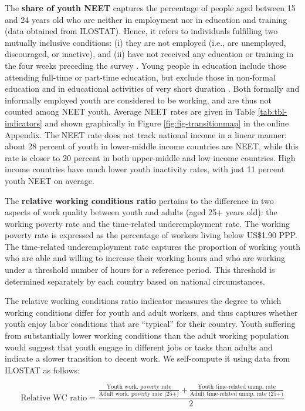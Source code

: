\documentclass[
  a4paper, twoside, 12pt]{book}
\begin{document}
The \textbf{share of youth NEET} captures the percentage of people aged between 15 and 24 years old who are neither in employment nor in education and training (data obtained from ILOSTAT). Hence, it refers to individuals fulfilling two mutually inclusive conditions: (i) they are not employed (i.e., are unemployed, discouraged, or inactive), and (ii) have not received any education or training in the four weeks preceding the survey \autocite{elder2015a}. Young people in education include those attending full-time or part-time education, but exclude those in non-formal education and in educational activities of very short duration \autocite{oecd2019}. Both formally and informally employed youth are considered to be working, and are thus not counted among NEET youth. Average NEET rates are given in Table \ref{tab:tbl-indicators} and shown graphically in Figure \ref{fig:fig-transitionmap} in the online Appendix. The NEET rate does not track national income in a linear manner: about 28 percent of youth in lower-middle income countries are NEET, while this rate is closer to 20 percent in both upper-middle and low income countries. High income countries have much lower youth inactivity rates, with just 11 percent youth NEET on average.

The \textbf{relative working conditions ratio} pertains to the difference in two aspects of work quality between youth and adults (aged 25+ years old): the working poverty rate and the time-related underemployment rate. The working poverty rate is expressed as the percentage of workers living below US\$1.90 PPP. The time-related underemployment rate captures the proportion of working youth who are able and willing to increase their working hours and who are working under a threshold number of hours for a reference period. This threshold is determined separately by each country based on national circumstances.

The relative working conditions ratio indicator measures the degree to which working conditions differ for youth and adult workers, and thus captures whether youth enjoy labor conditions that are ``typical'' for their country. Youth suffering from substantially lower working conditions than the adult working population would suggest that youth engage in different jobs or tasks than adults and indicate a slower transition to decent work. We self-compute it using data from ILOSTAT as follows:

\footnotesize

\[ \text{Relative WC ratio}= \frac{\displaystyle{\frac{\text{Youth work. poverty rate}}{\text{Adult work. poverty rate (25+)}}} + \displaystyle{\frac{\text{Youth time-related unmp. rate}}{\text{Adult time-related unmp. rate (25+)}}}}{2} \]
\normalsize
\vspace*{5pt}
\end{document}

